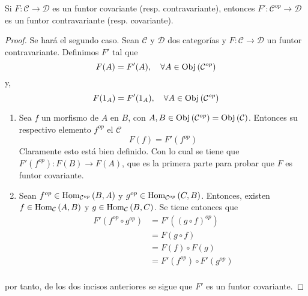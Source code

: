 \documentclass[12pt]{report}
\newcounter{it}
\theoremstyle{largebreak}
\newcommand\cf[3]{\ensuremath{#1:#2\rightarrow#3}}
\newcommand{\Obj}[1]{\ensuremath{\textup{Obj}\left(#1\right)}}
\newcommand{\Hom}[3]{\ensuremath{\textup{Hom}_{#1}\left(#2,#3\right)}}
\begin{document}
    \begin{propo}
        Si $\cf{F}{\mathcal{C}}{\mathcal{D}}$ es un funtor covariante (resp. contravariante), entonces $\cf{F'}{\mathcal{C}^{op}}{\mathcal{D}}$ es un funtor contravariante (resp. covariante).
    \end{propo}

    \begin{proof}
        Se hará el segundo caso. Sean $\mathcal{C}$ y $\mathcal{D}$ dos categorías y $\cf{F}{\mathcal{C}}{\mathcal{D}}$ un funtor contravariante. Definimos $F'$ tal que
        \begin{equation*}
            F(A)=F'(A),\quad\forall A\in\Obj{\mathcal{C}^{op}}
        \end{equation*}
        y,
        \begin{equation*}
            F(1_A)=F'(1_A),\quad\forall A\in\Obj{\mathcal{C}^{op}}
        \end{equation*}
        \begin{enumerate}
            \item Sea $f$ un morfismo de $A$ en $B$, con $A,B\in\Obj{\mathcal{C}^{op}}=\Obj{\mathcal{C}}$. Entonces su respectivo elemento $f^{op}$ el $\mathcal{C}$
            \begin{equation*}
                F(f)=F'(f^{op})
            \end{equation*}
            Claramente esto está bien definido. Con lo cual se tiene que $\cf{F'(f^{op})}{F(B)}{F(A)}$, que es la primera parte para probar que $F$ es funtor covariante.
            \item Sean $f^{op}\in\Hom{\mathcal{C}^{op}}{B}{A}$ y $g^{op}\in\Hom{\mathcal{C}^{op}}{C}{B}$. Entonces, existen $f\in\Hom{\mathcal{C}}{A}{B}$ y $g\in\Hom{\mathcal{C}}{B}{C}$. Se tiene entonces que
            \begin{equation*}
                \begin{split}
                    F'(f^{op}\circ g^{op})&=F'((g\circ f)^{op})\\
                    &=F(g\circ f)\\
                    &=F(f)\circ F(g)\\
                    &=F'(f^{op})\circ F'(g^{op})\\
                \end{split}
            \end{equation*}
        \end{enumerate}
        por tanto, de los dos incisos anteriores se sigue que $F'$ es un funtor covariante.
    \end{proof}
\end{document}
